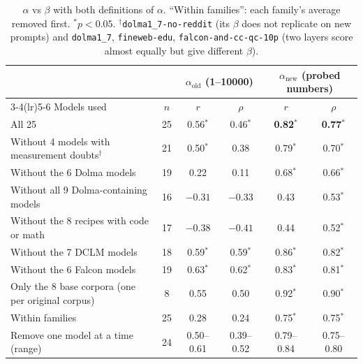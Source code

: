 \documentclass[11pt]{article}
\newcommand{\aold}{\alpha_{\text{old}}}
\newcommand{\anew}{\alpha_{\text{new}}}
\begin{document}
\begin{table}[h]
\centering\small
\caption{$\alpha$ vs $\beta$ with both definitions of $\alpha$. ``Within families'': each family's
average removed first. $^{*}p<0.05$. $^{\dagger}$\texttt{dolma1\_7-no-reddit} (its $\beta$ does not
replicate on new prompts) and \texttt{dolma1\_7}, \texttt{fineweb-edu}, \texttt{falcon-and-cc-qc-10p}
(two layers score almost equally but give different $\beta$).}
\label{tab:e11}
\begin{tabular}{@{}lc cc cc@{}}
\toprule
 & & \multicolumn{2}{c}{$\aold$ (1--10000)} & \multicolumn{2}{c}{$\anew$ (probed numbers)} \\
\cmidrule(lr){3-4}\cmidrule(lr){5-6}
Models used & $n$ & $r$ & $\rho$ & $r$ & $\rho$ \\
\midrule
All 25 & 25 & 0.56$^{*}$ & 0.46$^{*}$ & \textbf{0.82}$^{*}$ & \textbf{0.77}$^{*}$ \\
Without 4 models with measurement doubts$^{\dagger}$ & 21 & 0.50$^{*}$ & 0.38 & 0.79$^{*}$ & 0.70$^{*}$ \\
Without the 6 Dolma models & 19 & 0.22 & 0.11 & 0.68$^{*}$ & 0.66$^{*}$ \\
Without all 9 Dolma-containing models & 16 & $-0.31$ & $-0.33$ & 0.43 & 0.53$^{*}$ \\
Without the 8 recipes with code or math & 17 & $-0.38$ & $-0.41$ & 0.44 & 0.52$^{*}$ \\
Without the 7 DCLM models & 18 & 0.59$^{*}$ & 0.59$^{*}$ & 0.86$^{*}$ & 0.82$^{*}$ \\
Without the 6 Falcon models & 19 & 0.63$^{*}$ & 0.62$^{*}$ & 0.83$^{*}$ & 0.81$^{*}$ \\
Only the 8 base corpora (one per original corpus) & 8 & 0.55 & 0.50 & 0.92$^{*}$ & 0.90$^{*}$ \\
Within families & 25 & 0.28 & 0.24 & 0.75$^{*}$ & 0.75$^{*}$ \\
\midrule
Remove one model at a time (range) & 24 & 0.50--0.61 & 0.39--0.52 & 0.79--0.84 & 0.75--0.80 \\
\bottomrule
\end{tabular}
\end{table}
\end{document}
